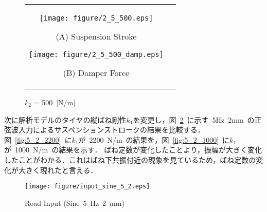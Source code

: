 \documentclass[a4paper,12pt]{article_vdlab_sotsuron}
\begin{document}
\vspace{10mm}
\begin{figure}[h]
    \begin{tabular}{cc}
      \begin{minipage}{0.45\hsize}
	\centering
	  \texttt{[image: figure/2\_5\_500.eps]}
	  \begin{center}
	  \vspace{2mm}
	  \ (A) Suspension Stroke\
	  \end{center}
	\end{minipage}
       \begin{minipage}{0.5\hsize}
	\centering
	  \texttt{[image: figure/2\_5\_500\_damp.eps]}
	  \begin{center}
	  \vspace{2mm}
	  \ (B) Damper Force\
	  \end{center}
      \end{minipage}
    \end{tabular}
    \vspace{2mm}
    \caption{$k_2$ = 500~[N/m]}
    \label{fig:k2_500}
\end{figure}

\newpage
次に解析モデルのタイヤの縦ばね剛性$k_1$を変更し，図~\ref{fig:5_2_}~に示す~5Hz~2mm~の正弦波入力によるサスペンションストロークの結果を比較する．
図~\ref{fig:5_2_2200}~に$k_1$が~2200~N/m~の結果を，図~\ref{fig:5_2_1000}~に$k_1$が~1000~N/m~の結果を示す．
ばね定数が変化したことより，振幅が大きく変化したことがわかる．これはばね下共振付近の現象を見ているため，ばね定数の変化が大きく現れたと言える．

\vspace{2mm}
\begin{figure}[h]
  \centering
   \texttt{[image: figure/input\_sine\_5\_2.eps]}
  \vspace{2mm}
\caption{Road Input (Sine~5~Hz~2~mm)}
  \label{fig:5_2_}
\end{figure}
\end{document}
